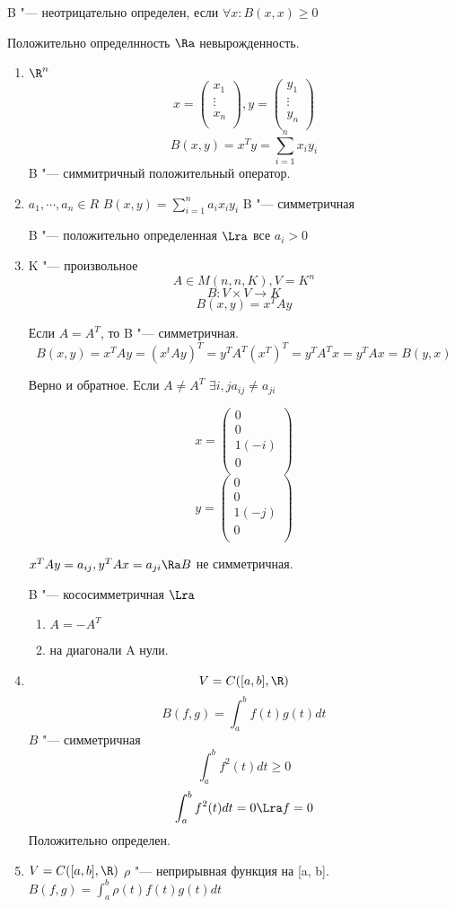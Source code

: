 \begin{Def}
B "--- неотрицательно определен, если $\forall x \colon B(x, x) \ge 0$
\end{Def}
\begin{Rem}
Положительно определнность $\Ra$ невырожденность.
\end{Rem}
\begin{exmp}
\begin{enumerate}
\item $\R^n$
$$x = 
\begin{pmatrix}
x_1\\
\vdots\\
x_n\\
\end{pmatrix}, 
y = 
\begin{pmatrix}
y_1\\
\vdots\\
y_n\\
\end{pmatrix}$$
$$B(x, y) = x^{T}y = \sum_{i = 1}^{n}x_iy_i$$
B "--- симмитричный положительный оператор.
\item $a_1, \cdots, a_n \in R$
$B(x, y) = \sum_{i = 1}^{n}a_ix_iy_i$
B "--- симметричная

B "--- положительно определенная $\Lra$ все $a_i > 0$

\item K "--- произвольное 
$$A \in M(n, n, K), V = K^{n}$$
$$B \colon V \times V \to K$$
$$B(x, y) = x^{T}Ay$$

Если $A = A^{T}$, то B "--- симметричная.
$$B(x, y) = x^TAy = (x^tAy)^T = y^TA^T(x^T)^T = y^TA^Tx = y^TAx = B(y, x)$$

Верно и обратное.
Если $A \ne A^{T}$
$\exists i, j a_{ij} \ne a_{ji}$

$$x = 
\begin{pmatrix}
0\\
0\\
1(-i)\\
0\\
\end{pmatrix}$$
$$y = 
\begin{pmatrix}
0\\
0\\
1(-j)\\
0\\
\end{pmatrix}$$

$x^{T}Ay = a_{ij}, y^TAx = a_{ji} \Ra B$ не симметричная.

B "--- кососимметричная $\Lra$
\begin{enumerate}
\item $A = -A^{T}$
\item на диагонали A нули. 
\end{enumerate}
\item
 $$V = C([a, b], \R)$$
 $$B(f, g) = \int_{a}^{b}f(t)g(t)dt$$
 $B$ "--- симметричная
 $$\int_{a}^{b}f^2(t)dt \ge 0$$
 $$\int_{a}^{b}f^2(t)dt = 0 \Lra f = 0$$
 Положительно определен.
\item $V = C([a, b], \R)$
$\rho$ "--- неприрывная функция на [a, b].
$B(f, g) = \int_{a}^{b}\rho(t)f(t)g(t)dt$


\end{enumerate}
\end{exmp}
